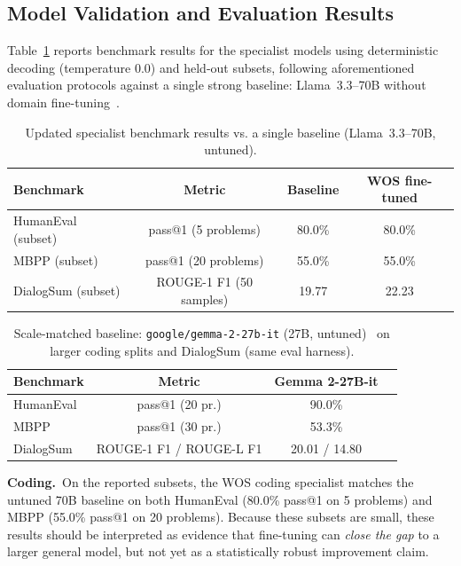 \documentclass[conference]{IEEEtran}
\begin{document}
\subsection{Model Validation and Evaluation Results}\label{subsec:eval_results}
Table~\ref{tab:eval_summary_updated} reports benchmark results for the specialist models using deterministic decoding (temperature 0.0) and held-out subsets, following aforementioned evaluation protocols against a single strong baseline: Llama~3.3--70B without domain fine-tuning~\cite{meta2024llama33}.

\begin{table}[!t]
\caption{Updated specialist benchmark results vs. a single baseline (Llama~3.3--70B, untuned).}
\label{tab:eval_summary_updated}
\centering
\footnotesize
\setlength{\tabcolsep}{5pt}
\renewcommand{\arraystretch}{1.15}
\begin{tabular}{@{}lccc@{}}
\toprule
\textbf{Benchmark} & \textbf{Metric} & \textbf{Baseline} & \textbf{WOS fine-tuned} \\
\midrule
HumanEval (subset) & pass@1 (5 problems) & 80.0\% & 80.0\% \\
MBPP (subset) & pass@1 (20 problems) & 55.0\% & 55.0\% \\
DialogSum (subset) & ROUGE-1 F1 (50 samples) & 19.77 & 22.23 \\
\bottomrule
\end{tabular}
\end{table}

\begin{table}[!t]
\caption{Scale-matched baseline: \texttt{google/gemma-2-27b-it} (27B, untuned)~\cite{team2024gemma2} on larger coding splits and DialogSum (same eval harness).}
\label{tab:gemma_baseline}
\centering
\footnotesize
\begin{tabular}{@{}lccc@{}}
\toprule
\textbf{Benchmark} & \textbf{Metric} & \textbf{Gemma 2-27B-it} \\
\midrule
HumanEval & pass@1 (20 pr.) & 90.0\% \\
MBPP & pass@1 (30 pr.) & 53.3\% \\
DialogSum & ROUGE-1 F1 / ROUGE-L F1 & 20.01 / 14.80 \\
\bottomrule
\end{tabular}
\end{table}

\textbf{Coding.}\, On the reported subsets, the WOS coding specialist matches the untuned 70B baseline on both HumanEval (80.0\% pass@1 on 5 problems) and MBPP (55.0\% pass@1 on 20 problems). Because these subsets are small, these results should be interpreted as evidence that fine-tuning can \emph{close the gap} to a larger general model, but not yet as a statistically robust improvement claim.
\end{document}
